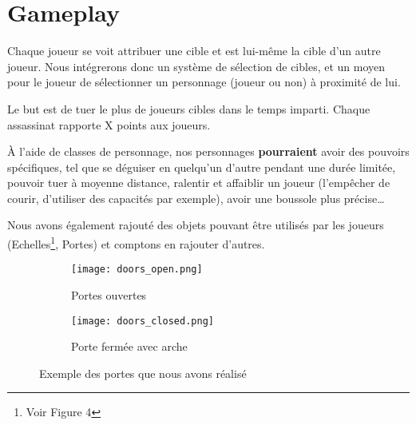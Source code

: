 \documentclass[../doc.tex]{subfiles}
\begin{document}
\section{Gameplay}

Chaque joueur se voit attribuer une cible et est lui-même la cible d'un autre joueur.
Nous intégrerons donc un système de sélection de cibles, et un moyen pour le joueur de sélectionner un personnage (joueur ou non) à proximité de lui.

Le but est de tuer le plus de joueurs cibles dans le temps imparti.
Chaque assassinat rapporte X points aux joueurs.

À l'aide de classes de personnage, nos personnages \textbf{pourraient} avoir des pouvoirs spécifiques,
tel que se déguiser en quelqu'un d'autre pendant une durée limitée,
pouvoir tuer à moyenne distance, ralentir et affaiblir un joueur
(l'empêcher de courir, d'utiliser des capacités par exemple), avoir une boussole plus précise\dots


Nous avons également rajouté des objets pouvant être utilisés par les joueurs
(Echelles\footnote{Voir Figure 4}, Portes) et comptons en rajouter d'autres.
\begin{figure}[hbt!]
    \centering
    \begin{subfigure}[t]{0.3\textwidth}
        \texttt{[image: doors\_open.png]} 
        \caption{Portes ouvertes}
    \end{subfigure}
    \hspace{50pt}
    \begin{subfigure}[t]{0.3\textwidth}
        \texttt{[image: doors\_closed.png]}
        \caption{Porte fermée avec arche}
    \end{subfigure}
    \caption{Exemple des portes que nous avons réalisé}
\end{figure}
\end{document}

